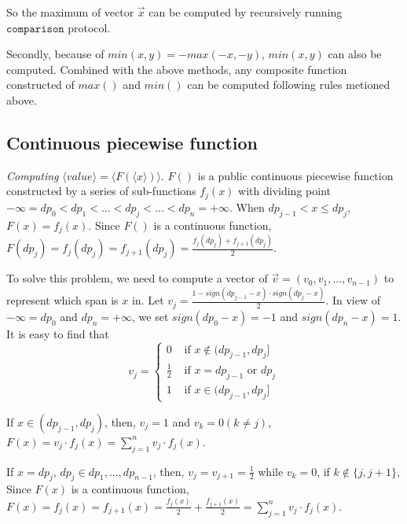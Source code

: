 \documentclass[letterpaper]{article} %
\begin{document}
       So the maximum of vector $\overrightarrow{x}$ can be computed by recursively running $\mathtt{comparison}$ protocol.

       Secondly, because of $min(x,y)=-max(-x,-y)$,  $min(x,y)$ can also be computed.
       Combined with the above methods,
       any composite function constructed of $max()$ and $min()$ can be computed following rules metioned above.






       \subsection{Continuous piecewise function}
       \emph{Computing} $\langle value\rangle  = \langle F(\langle x\rangle)\rangle $.
       $F()$ is a public continuous piecewise function constructed by a series of sub-functions $f_{j}(x)$
       with dividing point $-\infty =dp_{0}<dp_{1}<...<dp_{j}<...<dp_{n}=+\infty$.
       When $dp_{j-1}< x\leq dp_{j}$, $F(x) =f_{j}(x)$.
       Since $F()$ is a continuous function, $F(dp_{j}) =f_{j}(dp_{j})=f_{j+1}(dp_{j})=\frac{f_{j}(dp_{j})+f_{j+1}(dp_{j})}{2}$.


       To solve this problem, we need to compute a vector of
       $\overrightarrow{v}=(v_{0},v_{1},...,v_{n-1})$ to represent which span is $x$ in.
       Let $v_{j} = \frac{1-sign(dp_{j-1}-x)\cdot sign(dp_{j}-x)}{2}$.
       In view of $-\infty =dp_{0}$ and $dp_{n}=+\infty$,
       we set $sign(dp_{0}-x)=-1$ and $sign(dp_{n}-x)=1$.
       It is easy to find that
       $$v_{j}=\begin{cases}
           0 & \text{ if } x\notin (dp_{j-1},dp_{j}] \\
           \frac{1}{2} & \text{ if } x = dp_{j-1} \text{ or } dp_{j}\\
           1 & \text{ if } x\in (dp_{j-1},dp_{j}]
          \end{cases}$$

       If $x\in (dp_{j-1},dp_{j})$, then, $v_{j}=1$ and $v_{k}=0 (k\neq j)$, $F(x)=v_{j}\cdot f_{j}(x)=\sum_{j=1}^{n}v_{j}\cdot f_{j}(x)$.

       If $x=dp_{j} $, $ dp_{j}\in {dp_{1},...,dp_{n-1}}$,
       then, $v_{j}=v_{j+1}=\frac{1}{2}$ while $v_{k}=0$, if $ k\notin \{j,j+1\}$,
       Since $F(x)$ is a continuous function,
       $F(x)=f_{j}(x)=f_{j+1}(x)=\frac{f_{j}(x)}{2}+\frac{f_{j+1}(x)}{2}=\sum_{j=1}^{n}v_{j}\cdot f_{j}(x)$.
\end{document}
